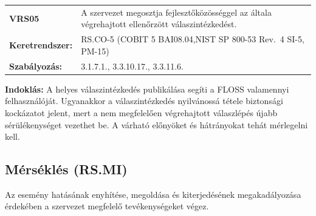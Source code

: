 \documentclass[12pt,magyar,a4paper,oneside]{scrreprt}
\begin{document}
\begin{longtable}[]{@{}ll@{}}
\toprule
\endhead
\begin{minipage}[t]{0.16\columnwidth}\raggedright
\textbf{VRS05}\strut
\end{minipage} & \begin{minipage}[t]{0.79\columnwidth}\raggedright
A szervezet megosztja fejlesztőközösséggel az általa végrehajtott
ellenőrzött válaszintézkedést.\strut
\end{minipage}\tabularnewline
\begin{minipage}[t]{0.16\columnwidth}\raggedright
\textbf{Keretrendszer:}\strut
\end{minipage} & \begin{minipage}[t]{0.79\columnwidth}\raggedright
RS.CO-5 (COBIT 5 BAI08.04,NIST SP 800-53 Rev.~4 SI-5, PM-15)\strut
\end{minipage}\tabularnewline
\begin{minipage}[t]{0.16\columnwidth}\raggedright
\textbf{Szabályozás:}\strut
\end{minipage} & \begin{minipage}[t]{0.79\columnwidth}\raggedright
3.1.7.1., 3.3.10.17., 3.3.11.6.\strut
\end{minipage}\tabularnewline
\bottomrule
\end{longtable}

\textbf{Indoklás: } A helyes válaszintézkedés publikálása segíti a FLOSS
valamennyi felhasználóját. Ugyanakkor a válaszintézkedés nyilvánossá
tétele biztonsági kockázatot jelent, mert a nem megfelelően végrehajtott
válaszlépés újabb sérülékenységet vezethet be. A várható előnyöket és
hátrányokat tehát mérlegelni kell.

\hypertarget{muxe9rsuxe9kluxe9s-rs.mi}{%
\subsection{Mérséklés (RS.MI)}\label{muxe9rsuxe9kluxe9s-rs.mi}}

Az esemény hatásának enyhítése, megoldása és kiterjedésének
megakadályozása érdekében a szervezet megfelelő tevékenységeket végez.
\end{document}
